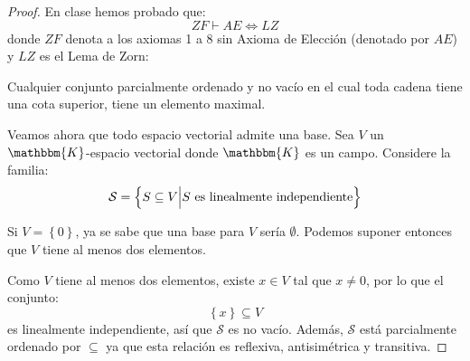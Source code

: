 \documentclass[12pt]{article}
\newcounter{it}
\theoremstyle{largebreak}
\newcommand{\bbm}[1]{\mathbbm{#1}}
\begin{document}
    \begin{proof}
        En clase hemos probado que:
        \begin{equation*}
            ZF\vdash AE\iff LZ
        \end{equation*}
        donde $ZF$ denota a los axiomas 1 a 8 sin Axioma de Elección (denotado por $AE$) y $LZ$ es el Lema de Zorn:

        \begin{theor}
            Cualquier conjunto parcialmente ordenado y no vacío en el cual toda cadena tiene una cota superior, tiene un elemento maximal.
        \end{theor}

        Veamos ahora que todo espacio vectorial admite una base. Sea $V$ un $\bbm{K}$-espacio vectorial donde $\bbm{K}$ es un campo. Considere la familia:
        \begin{equation*}
            \mathcal{S}=\left\{S\subseteq V\Big|S\textup{ es linealmente independiente}\right\}
        \end{equation*}

        Si $V=\left\{0\right\}$, ya se sabe que una base para $V$ sería $\emptyset$. Podemos suponer entonces que $V$ tiene al menos dos elementos.

        Como $V$ tiene al menos dos elementos, existe $x\in V$ tal que $x\neq 0$, por lo que el conjunto:
        \begin{equation*}
            \left\{x\right\}\subseteq V
        \end{equation*}
        es linealmente independiente, así que $\mathcal{S}$ es no vacío. Además, $\mathcal{S}$ está parcialmente ordenado por $\subseteq$ ya que esta relación es reflexiva, antisimétrica y transitiva.


\end{proof}
\end{document}
